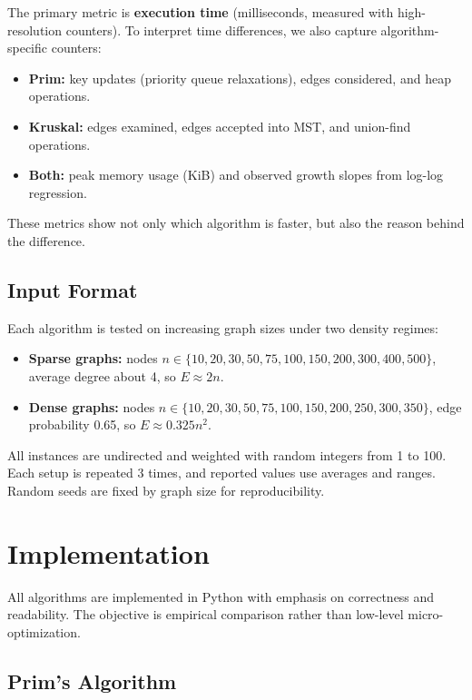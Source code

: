 \documentclass{labreport}
\begin{document}
The primary metric is \textbf{execution time} (milliseconds, measured with high-resolution counters). To interpret time differences, we also capture algorithm-specific counters:

\begin{itemize}
    \item \textbf{Prim:} key updates (priority queue relaxations), edges considered, and heap operations.
    \item \textbf{Kruskal:} edges examined, edges accepted into MST, and union-find operations.
    \item \textbf{Both:} peak memory usage (KiB) and observed growth slopes from log-log regression.
\end{itemize}

These metrics show not only which algorithm is faster, but also the reason behind the difference.

\subsection{Input Format}

Each algorithm is tested on increasing graph sizes under two density regimes:

\begin{itemize}
    \item \textbf{Sparse graphs:} nodes $n \in \{10, 20, 30, 50, 75, 100, 150, 200, 300, 400, 500\}$, average degree about 4, so $E \approx 2n$.

    \item \textbf{Dense graphs:} nodes $n \in \{10, 20, 30, 50, 75, 100, 150, 200, 250, 300, 350\}$, edge probability 0.65, so $E \approx 0.325n^2$.
\end{itemize}

All instances are undirected and weighted with random integers from 1 to 100. Each setup is repeated 3 times, and reported values use averages and ranges. Random seeds are fixed by graph size for reproducibility.

\section{Implementation}

All algorithms are implemented in Python with emphasis on correctness and readability. The objective is empirical comparison rather than low-level micro-optimization.

\subsection{Prim's Algorithm}
\end{document}
